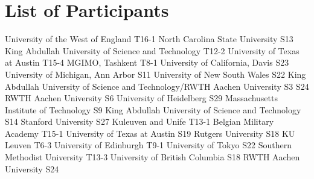 \chapter{List of Participants}

\setlength{\columnsep}{1cm}

\begin{multicols}{2}

\small\raggedright

{University of the West of England}
{T16-1}
{}
{}
{}
{}
{}
{}
{North Carolina State University}
{S13}
{}
{}
{}
{}
{}
{}
{King Abdullah University of Science and Technology}
{T12-2}
{}
{}
{}
{}
{}
{}
{University of Texas at Austin}
{T15-4}
{}
{}
{}
{}
{}
{}
{MGIMO, Tashkent}
{T8-1}
{}
{}
{}
{}
{}
{}
{University of California, Davis}
{S23}
{}
{}
{}
{}
{}
{}
{University of Michigan, Ann Arbor}
{S11}
{}
{}
{}
{}
{}
{}
{University of New South Wales}
{S22}
{}
{}
{}
{}
{}
{}
{King Abdullah University of Science and Technology/RWTH Aachen University}
{S3}
{S24}
{}
{}
{}
{}
{}
{RWTH Aachen University}
{S6}
{}
{}
{}
{}
{}
{}
{University of Heidelberg}
{S29}
{}
{}
{}
{}
{}
{}
{Massachusetts Institute of Technology}
{S9}
{}
{}
{}
{}
{}
{}
{King Abdullah University of Science and Technology}
{S14}
{}
{}
{}
{}
{}
{}
{Stanford University}
{S27}
{}
{}
{}
{}
{}
{}
{Kuleuven and Unife}
{T13-1}
{}
{}
{}
{}
{}
{}
{Belgian Military Academy}
{T15-1}
{}
{}
{}
{}
{}
{}
{University of Texas at Austin}
{S19}
{}
{}
{}
{}
{}
{}
{Rutgers University}
{S18}
{}
{}
{}
{}
{}
{}
{KU Leuven}
{T6-3}
{}
{}
{}
{}
{}
{}
{University of Edinburgh}
{T9-1}
{}
{}
{}
{}
{}
{}
{University of Tokyo}
{S22}
{}
{}
{}
{}
{}
{}
{Southern Methodist University}
{T13-3}
{}
{}
{}
{}
{}
{}
{University of British Columbia}
{S18}
{}
{}
{}
{}
{}
{}
{RWTH Aachen University}
{S24}
{}
{}
{}
{}
{}
{}

\end{multicols}
